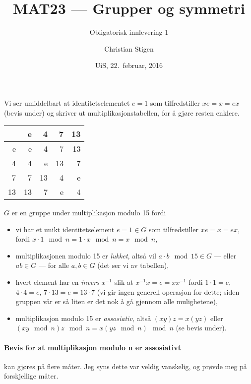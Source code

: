 \documentclass[a4paper,norsk,12pt]{article}
\title{MAT23   --- Grupper og symmetri}
\subtitle{Obligatorisk innlevering 1}
\author{Christian Stigen}
\date{UiS, 22.~februar, 2016}
\begin{document}
\maketitle

Vi ser umiddelbart at identitetselementet $e=1$ som tilfredstiller $xe=x=ex$
(bevis under) og skriver ut multiplikasjonstabellen, for å gjøre resten
enklere.

\begin{table}[htp]
  \centering
  \begin{tabular}{r|rrrr}
       &  e &  4 &  7 & 13 \\ \hline
     e &  e &  4 &  7 & 13 \\
     4 &  4 &  e & 13 &  7 \\
     7 &  7 & 13 &  4 &  e \\
    13 & 13 &  7 &  e &  4 \\
  \end{tabular}
\end{table}

$G$ er en gruppe under multiplikasjon modulo 15 fordi
\begin{itemize}
  \item vi har et unikt identitetselement $e=1 \in G$ som tilfredstiller
    $xe=x=ex$, fordi $x\cdot1 \mod{n} = 1\cdot x \mod{n} = x \mod{n}$,
  \item multiplikasjonen modulo 15 er \textit{lukket}, altså vil $a\cdot b
    \mod{15} \in G$ --- eller $ab \in G$ --- for alle $a,b \in G$ (det ser vi
    av tabellen),
  \item hvert element har en \textit{invers} $x^{-1}$ slik at
    $x^{-1}x=e=xx^{-1}$ fordi $1\cdot1=e$, $4\cdot4=e$, $7\cdot13=e=13\cdot7$
    (vi gir ingen generell operasjon for dette; siden gruppen vår er så liten
    er det nok å gå gjennom alle mulighetene),
  \item multiplikasjon modulo 15 er \textit{assosiativ}, altså $(xy)z = x(yz)$
    eller
    $(xy\mod{n})z \mod{n} = x(yz \mod{n}) \mod{n}$ (se bevis under).
\end{itemize}

\paragraph{Bevis for at multiplikasjon modulo n er assosiativt} kan gjøres på
flere måter. Jeg syns dette var veldig vanskelig, og prøvde meg på forskjellige
måter.



\end{document}
